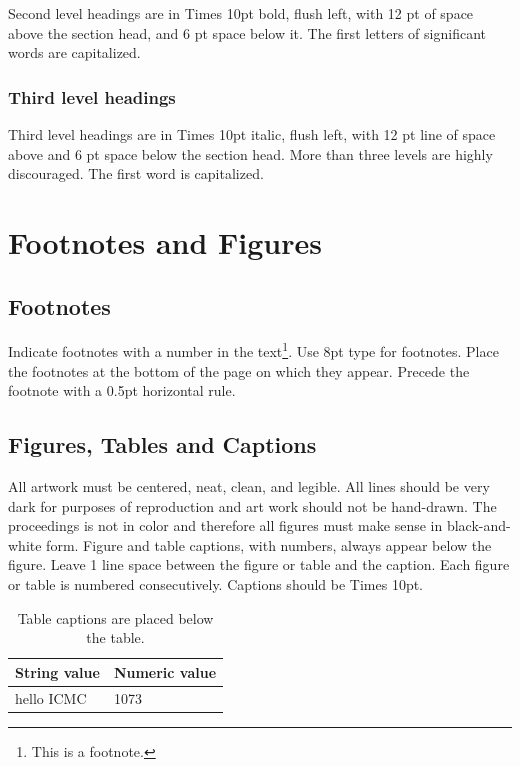 \documentclass[twoside,10pt]{article}
\begin{document}
Second level headings are in Times 10pt bold, flush left, with 12 pt of space above the section head, and 6 pt space below it.  The first letters of significant words are capitalized.

\subsubsection{Third level headings}

Third level headings are in Times 10pt italic, flush left, with 12 pt line of space above and 6 pt space below the section head. More than three levels are highly discouraged.  The first word is capitalized.

\section{Footnotes and Figures}

\subsection{Footnotes}

Indicate footnotes with a number in the text\footnote{This is a footnote.}.
Use 8pt type for footnotes. Place the footnotes at the bottom of the page
on which they appear. Precede the footnote with a 0.5pt horizontal rule.

\subsection{Figures, Tables and Captions}

All artwork must be centered, neat, clean, and legible. All lines
should be very dark for purposes of reproduction and art work should
not be hand-drawn.  The proceedings is not in color and therefore all
figures must make sense in black-and-white form.  Figure and table
captions, with numbers, always appear below the figure. Leave 1 line
space between the figure or table and the caption. Each figure or
table is numbered consecutively. Captions should be Times 10pt.

\begin{table}[htbp]
\begin{center}
\begin{tabular}{|l|l|}
\hline
String value & Numeric value \\
\hline
hello ICMC  & 1073 \\
\hline
\end{tabular}
\end{center}
\caption{Table captions are placed below the table.}
\label{tab:example}
\end{table}
\end{document}
